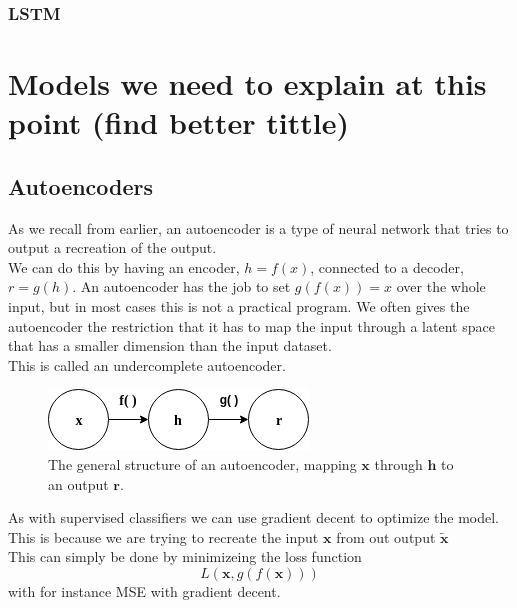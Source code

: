      \subsubsection{LSTM}
	
	
\section{Models we need to explain at this point (find better tittle)}
    \subsection{Autoencoders}\label{Explaining_autoencoders}
	  As we recall from earlier, an autoencoder is a type of neural network that tries to output a recreation of the output. \\ 
	  
	  We can do this by having an encoder, $h=f(x)$, connected to a decoder, $r=g(h)$. 
	  An autoencoder has the job to set $g(f(x))=x$ over the whole input, but in most cases this is not a practical program. We often gives the autoencoder the restriction
	  that it has to map the input through a latent space that has a smaller dimension than the input dataset.\\
	  This is called an undercomplete autoencoder.\\
	  \vspace{10px}
	  \begin{figure}[ht!]
	    \centering
	    \includegraphics[scale=0.5]{background/figures/SimpleAE.png}
	    \caption{The general structure of an autoencoder, mapping $\textbf{x}$ through $\textbf{h}$ to an output $\textbf{r}$.}
	  \end{figure}
	  
	  As with supervised classifiers we can use gradient decent to optimize the model. This is because we are trying to recreate the input $\textbf{x}$ from out output $\widetilde{\textbf{x}}$\\
	  
	  This can simply be done by minimizeing the loss function\\
	  \begin{equation}
	    L(\textbf{x},g(f(\textbf{x})))
	  \end{equation}
	  with for instance MSE with gradient decent. \\
	  
